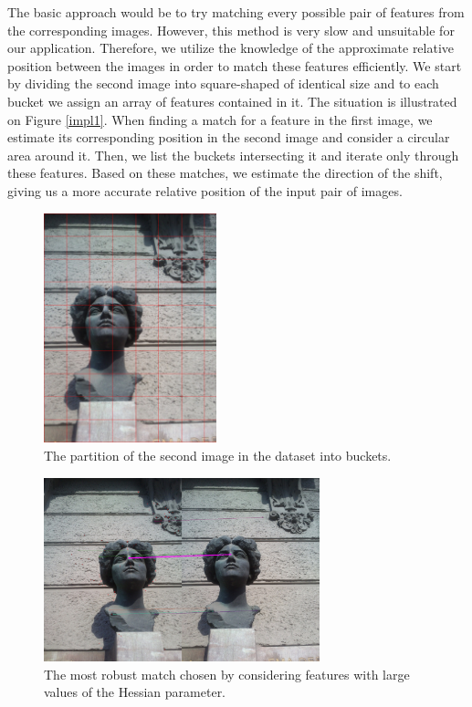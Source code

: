 The basic approach would be to try matching every possible pair of features from the corresponding images. 
However, this method is very slow and unsuitable for our application. 
Therefore, we utilize the knowledge of the approximate relative position between the images in order to match these features efficiently.
We start by dividing the second image into square-shaped  of identical size and to each bucket we assign an array of features contained in it.
The situation is illustrated on Figure \ref{impl1}.
When finding a match for a feature in the first image, we estimate its corresponding position in the second image and consider a circular area around it. 
Then, we list the buckets intersecting it and iterate only through these features. 
Based on these matches, we estimate the direction of the shift, giving us a more accurate relative position of the input pair of images.

\begin{figure}[H]
\centering
\includegraphics[width=5cm]{img/ema_buckets.png}
\caption{The partition of the second image in the dataset into buckets.}
\label{emabuckets}
\end{figure} 

\begin{figure}[H]
\centerline{
\includegraphics[width=8cm]{img/ema_direction.png}}
\caption{The most robust match chosen by considering features with large values of the Hessian parameter.}
\label{fig:robust_match}
\end{figure}

